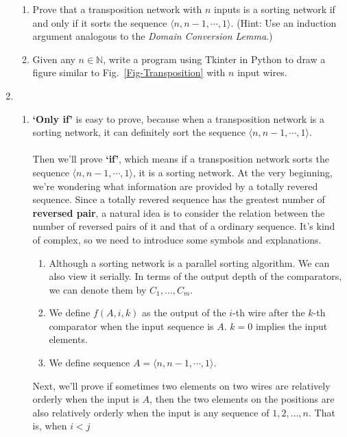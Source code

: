 \documentclass[12pt,a4paper]{article}
\makeatletter
\newtheorem*{solution}{Solution}
\theoremstyle{definition}
\renewenvironment{solution}[1][Solution] {\par\pushQED{\qed}\normalfont\topsep6\p@\@plus6\p@\relax\trivlist\item[\hskip\labelsep\bfseries#1\@addpunct{.}]\ignorespaces}{\popQED\endtrivlist\@endpefalse} \makeatother
\makeatother
\begin{document}
\begin{enumerate}
\begin{enumerate}
\item Prove that a transposition network with $n$ inputs is a sorting network if and only if it sorts the sequence $\langle n, n-1, \cdots, 1 \rangle$. {\color{blue}(Hint: Use an induction argument analogous to the \emph{Domain Conversion Lemma}.)}
\item {\color{red}{(Optional Sub-question with Bonus)}} Given any $n \in \mathbb{N}$, write a program using Tkinter in Python to draw a figure similar to Fig.~\ref{Fig-Transposition} with $n$ input wires.
\end{enumerate}
\begin{solution}
~
\begin{enumerate}
    \item \textbf{`Only if'} is easy to prove, because when a transposition network is a sorting network, it can definitely sort the sequence $\langle n, n-1, \cdots, 1 \rangle$.\\
    ~\\
    Then we'll prove \textbf{`if'}, which means if a transposition network sorts the sequence $\langle n, n-1, \cdots, 1 \rangle$, it is a sorting network. At the very beginning, we're wondering what information are provided by a totally revered sequence. Since a totally revered sequence has the greatest number of \textbf{reversed pair}, a natural idea is to consider the relation between the number of reversed pairs of it and that of a ordinary sequence. It's kind of complex, so we need to introduce some symbols and explanations.\\
    \begin{enumerate}
        \item Although a sorting network is a parallel sorting algorithm. We can also view it serially. In terms of the output depth of the comparators, we can denote them by $C_1,\dots,C_m$.
        \item We define $f(A,i,k)$ as the output of the $i$-th wire after the $k$-th comparator when the input sequence is $A$. $k=0$ implies the input elements.
        \item We define sequence $A = \langle n, n-1, \cdots, 1 \rangle$.
    \end{enumerate}
    Next, we'll prove if sometimes two elements on two wires are relatively orderly when the input is $A$, then the two elements on the positions are also relatively orderly when the input is any sequence of $1,2,\dots,n$. That is, when $i<j$
    \begin{equation}

\end{equation}
\end{enumerate}
\end{solution}
\end{enumerate}
\end{document}
